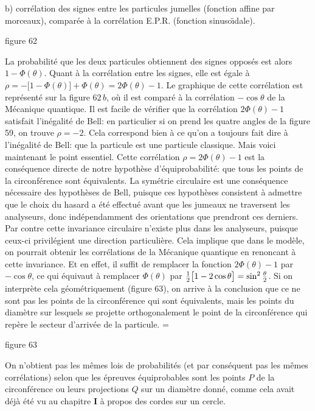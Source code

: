 \vskip3mm
\centerline{\vbox{\hsize=11cm 
\eightpoint b) corr\'elation des signes entre les particules 
jumelles (fonction affine par morceaux), compar\'ee  \`a la corr\'elation  
E.P.R. (fonction sinuso\"\i dale).}  } 
\vskip3mm 
\centerline{\eightpoint figure 62} 
\vskip3mm 
\endinsert 
La probabilit\'e que les deux particules obtiennent des signes oppos\'es 
est alors $1 - \Phi (\theta )$. Quant \`a la corr\'elation entre les 
signes, elle  est \'egale \`a $\rho = -\big[ 1 - \Phi (\theta ) \big] + 
\Phi (\theta )  = 2\Phi (\theta ) - 1$. Le graphique de cette 
corr\'elation est repr\'esent\'e sur la figure $62\, b$, o\`u il est 
compar\'e \`a la  corr\'elation  $-\cos\theta$ de la M\'ecanique  
quantique. 
\medskip 
Il est facile de v\'erifier que la corr\'elation $2\Phi (\theta ) - 1$ 
satisfait l'in\'egalit\'e de Bell: en particulier si on prend les quatre  
angles de la figure 59, on trouve $\rho = -2$. Cela correspond bien \`a  
ce qu'on a toujours fait dire \`a l'in\'egalit\'e de Bell: que la particule  
est  une particule classique.   
\medskip 
Mais voici maintenant le point essentiel. Cette corr\'elation $\rho = 
2\Phi (\theta ) - 1$ est la cons\'equence directe de notre hypoth\`ese 
d'\'equiprobabilit\'e: que tous les points de la 
circonf\'erence sont \'equivalents. La sym\'etrie circulaire est une 
cons\'equence n\'ecessaire des hypoth\`eses de Bell, 
puisque ces hypoth\`eses consistent \`a admettre que le choix du hasard 
a \'et\'e effectu\'e avant que les jumeaux ne traversent les analyseurs, 
donc ind\'ependamment des orientations que prendront ces derniers. Par
contre cette invariance circulaire n'existe plus dans les analyseurs, 
puisque ceux-ci privil\'egient une direction particuli\`ere.  Cela 
implique que dans le mod\`ele,  on pourrait obtenir les corr\'elations de   
la M\'ecanique quantique en renoncant \`a cette invariance. Et en effet,  
il suffit de remplacer la fonction $2\Phi (\theta ) - 1$ par 
$-\cos\theta$, ce qui \'equivaut \`a remplacer $\Phi (\theta )$ par 
${1\over 2}\big[ 1 - 2\cos\theta \big] = \sin^2{\theta\over 2}$. Si on 
interpr\`ete cela g\'eom\'etriquement (figure 63),  on arrive \`a la 
conclusion que ce ne  sont pas les points de la circonf\'erence qui sont 
\'equivalents, mais les points du diam\`etre sur lesquels se projette 
orthogonalement le point  de la circonf\'erence qui rep\`ere le secteur 
d'arriv\'ee de la particule.   
\medskip 
\midinsert 
\epsfxsize=\hsize
{} 
\vskip3mm
\centerline{\eightpoint figure 63} 
\vskip4pt 
\centerline{\vbox{\hsize=11cm \eightpoint  
On n'obtient pas les m\^emes lois de probabilit\'es (et par cons\'equent  
pas les m\^emes corr\'elations) selon que les \'epreuves \'equiprobables  
sont les points $P$ de la circonf\'erence ou leurs projections $Q$ sur un 
diam\`etre donn\'e, comme cela avait d\'ej\`a \'et\'e vu au chapitre  
{\bf  I} \`a propos des cordes sur un cercle.}  } 
